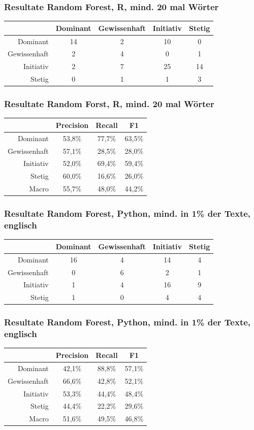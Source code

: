 \documentclass{beamer}
\begin{document}
\begin{frame}
\frametitle{Resultate Random Forest, R, mind. 20 mal Wörter}
\begin{center}
\begin{tabular}{r|c|c|c|c|}
 &  Dominant  & Gewissenhaft & Initiativ & Stetig\\
\hline
Dominant & 14 & 2 & 10& 0 \\
Gewissenhaft & 2 & 4 & 0 & 1\\
Initiativ & 2 & 7  & 25 & 14\\
Stetig & 0 & 1 & 1 &  3
\end{tabular}
\end{center}
\end{frame}
\begin{frame}
\frametitle{Resultate Random Forst, R, mind. 20 mal Wörter}
\begin{center}
\begin{tabular}{r|c|c|c|}
 &  Precision  & Recall & F1 \\
\hline
Dominant     & 53,8\% & 77,7\% & 63,5\% \\
Gewissenhaft & 57,1\% & 28,5\% & 28,0\% \\
Initiativ    & 52,0\% & 69,4\% & 59,4\% \\
Stetig       & 60,0\% & 16,6\% & 26,0\% \\
\hline
Macro        & 55,7\% & 48,0\% & 44,2\%
\end{tabular}
\end{center}
\end{frame}
\begin{frame}
\frametitle{Resultate Random Forest, Python, mind. in 1\% der Texte, englisch}
\begin{center}
\begin{tabular}{r|c|c|c|c|}
 &  Dominant  & Gewissenhaft & Initiativ & Stetig\\
\hline
Dominant & 16 & 4 & 14 & 4 \\
Gewissenhaft & 0 & 6 & 2 & 1\\
Initiativ & 1 & 4 & 16 & 9\\
Stetig & 1 & 0 & 4 & 4
\end{tabular}
\end{center}
\end{frame}
\begin{frame}
\frametitle{Resultate Random Forest, Python, mind. in 1\% der Texte, englisch}
\begin{center}
\begin{tabular}{r|c|c|c|}
 &  Precision  & Recall & F1 \\
\hline
Dominant     & 42,1\% & 88,8\% & 57,1\% \\
Gewissenhaft & 66,6\% & 42,8\% & 52,1\% \\
Initiativ    & 53,3\% & 44,4\% & 48,4\% \\
Stetig       & 44,4\% & 22,2\% & 29,6\% \\
\hline
Macro        & 51,6\% & 49,5\% & 46,8\%
\end{tabular}
\end{center}
\end{frame}
\end{document}
